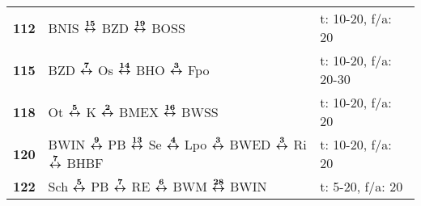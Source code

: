 \begin{minipage}[t]{0.45\textwidth}
\begin{tabular}{>{\bfseries}L{1.2cm}L{9.0cm}L{3.0cm}}
\bus{} 112    & BNIS $\xarwe{15}$ BZD $\xarwe{19}$ BOSS                                                                                                                             & t: 10-20, f/a: 20          \\
\bus{} 115    & BZD $\xarwe{7}$ Os $\xarwe{14}$ BHO $\xarwe{3}$ Fpo                                                                                                                 & t: 10-20, f/a: 20-30       \\
\bus{} 118    & Ot $\xarwe{5}$ K $\xarwe{2}$ BMEX $\xarwe{16}$ BWSS
& t: 10-20, f/a: 20          \\
\bus{} 120    & BWIN $\xarwe{9}$ PB $\xarwe{13}$ Se $\xarwe{4}$ Lpo $\xarwe{3}$ BWED $\xarwe{3}$ Ri $\xarwe{7}$ BHBF                                                                & t: 10-20, f/a: 20          \\
\bus{} 122    & Sch $\xarwe{5}$ PB $\xarwe{7}$ RE $\xarwe{6}$ BWM $\xarwe{28}$ BWIN                                                                                                 & t: 5-20, f/a: 20           \\
\hline
\end{tabular}
\end{minipage}
\begin{minipage}[t]{0.05\textwidth}
\phantom{Tor}
\end{minipage}

